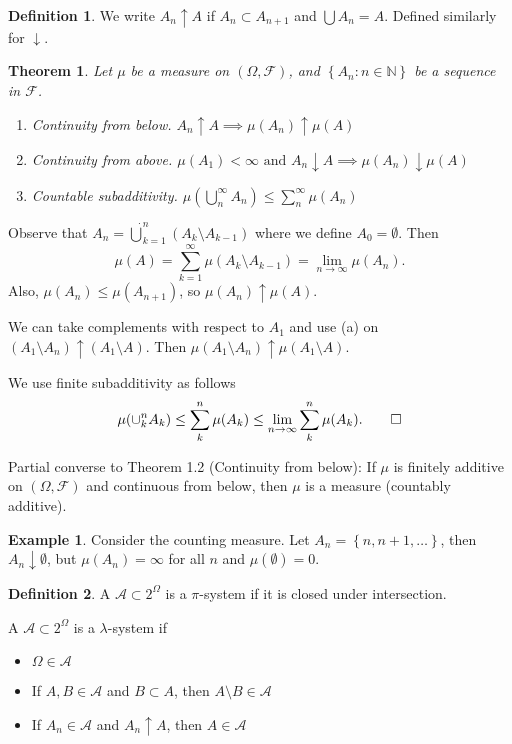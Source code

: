 \documentclass[11pt]{article}
\newtheorem{thm}{Theorem}[section]
\theoremstyle{definition}
\newtheorem{defn}{Definition}[section]
\newtheorem{example}{Example}[section]
\newcommand{\sm}[0]{\setminus}
\newcommand{\set}[1]{\left\{ #1 \right\}}
\newcommand{\NN}{\mathbb{N}}
\newcommand{\m}[1]{\mathcal{#1}}
\begin{document}

\begin{defn}
    We write $A_n \uparrow A$ if $A_n\subset A_{n+1}$ and $\bigcup A_n = A$.
    Defined similarly for $\downarrow$.
\end{defn}

\begin{thm}
    Let $\mu$ be a measure on $(\Omega,\m{F})$, and $\set{A_n:n\in\NN}$ be a sequence in $\m{F}$.
    \begin{enumerate}
        \item[(a)] Continuity from below. $A_n\uparrow A \implies \mu(A_n) \uparrow \mu(A)$
        \item[(b)] Continuity from above. $\mu(A_1)<\infty \text{ and } A_n\downarrow A \implies
            \mu(A_n) \downarrow \mu(A)$
        \item[(c)] Countable subadditivity. $\mu(\bigcup_n^\infty A_n) \le \sum_n^\infty \mu(A_n)$
    \end{enumerate}
\end{thm}

\proof[Proof of (a)]
Observe that $A_n = \dot\bigcup_{k=1}^n (A_k\sm A_{k-1})$ where we define $A_0 = \emptyset$. Then
$$ \mu(A) = \sum_{k=1}^\infty \mu(A_k\sm A_{k-1}) = \lim_{n\to\infty} \mu(A_n) . $$
Also, $\mu(A_n) \le \mu(A_{n+1})$, so $\mu(A_n)\uparrow\mu(A)$. 
\qedhere

\proof[Proof of (b)]
We can take complements with respect to $A_1$ and use (a) on $(A_1 \sm A_n) \uparrow (A_1 \sm A)$.
Then $\mu(A_1 \sm A_n) \uparrow \mu(A_1 \sm A)$. 
\qedhere

\proof[Proof of (c)]
We use finite subadditivity as follows
\[
    \mu(\cup_k^n A_k) \le \sum_k^n \mu(A_k) \le \lim_{n\to\infty} \sum_k^n \mu(A_k). \qedhere
\]
\qedhere

Partial converse to Theorem 1.2 (Continuity from below): If $\mu$ is finitely additive on
$(\Omega,\m{F})$ and continuous from below, then $\mu$ is a measure (countably additive).


\begin{example}
    Consider the counting measure. Let $A_n = \set{n,n+1,\dots}$, then $A_n\downarrow\emptyset$, but
    $\mu(A_n) = \infty$ for all $n$ and $\mu(\emptyset) = 0$.
\end{example}

\begin{defn}
    A $\m{A}\subset 2^\Omega$ is a $\pi$-system if it is closed under intersection.

    A $\m{A}\subset 2^\Omega$ is a $\lambda$-system if
    \begin{itemize}
        \item[(i)] $\Omega\in\m{A}$
        \item[(ii)] If $A,B\in\m{A}$ and $B\subset A$, then $A\sm B \in \m{A}$
        \item[(iii)] If $A_n\in\m{A}$ and $A_n \uparrow A$, then $A\in\m{A}$
    \end{itemize}
\end{defn}
\end{document}
